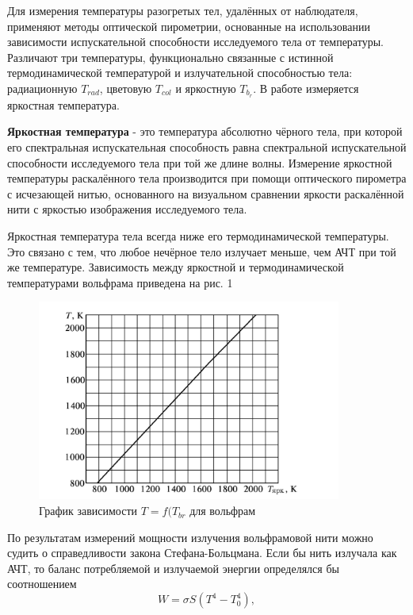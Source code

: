 \documentclass[15pt,a5paper,reqno]{article}
\begin{document}
Для измерения температуры разогретых тел, удалённых от наблюдателя, применяют методы оптической пирометрии, основанные на использовании зависимости испускательной способности исследуемого тела от температуры. Различают три температуры, функционально связанные с истинной термодинамической температурой и излучательной способностью тела: радиационную $T_{rad}$, цветовую $T_{col}$ и яркостную $T_{b_r}$.
В работе измеряется яркостная температура.

\textbf{Яркостная температура} - это температура абсолютно чёрного тела, при которой его спектральная испускательная способность равна спектральной испускательной способности исследуемого тела при той же длине волны.
 Измерение яркостной температуры раскалённого тела производится при помощи оптического пирометра с исчезающей нитью, основанного на визуальном сравнении яркости раскалённой нити с яркостью изображения исследуемого тела. \par
Яркостная температура тела всегда ниже его термодинамической температуры. Это связано с тем, что любое нечёрное тело излучает меньше, чем АЧТ при той же температуре. Зависимость между яркостной и термодинамической температурами вольфрама приведена на рис. 1

\begin{figure}[h]
    \centering
    \includegraphics[width=10cm]{pics/lab_5_8_1_theor.png}
    \caption{График зависимости $T = f(T_{br}$ для вольфрам}
    \label{fig:vac}
\end{figure}

По результатам измерений мощности излучения вольфрамовой нити можно судить о справедливости закона Стефана-Больцмана. Если бы нить излучала как АЧТ, то баланс потребляемой и излучаемой энергии определялся бы соотношением 
\begin{equation}
    W = \sigma S (T^4 - T_0^4),
\end{equation}
\end{document}
